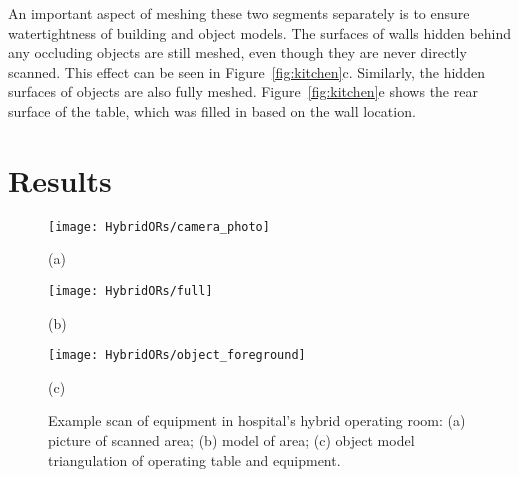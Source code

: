 \documentclass[review]{acmsiggraph}
\begin{document}
An important aspect of meshing these two segments separately is to ensure watertightness of building and object models.  The surfaces of walls hidden behind any occluding objects are still meshed, even though they are never directly scanned.  This effect can be seen in Figure~\ref{fig:kitchen}c.  Similarly, the hidden surfaces of objects are also fully meshed.  Figure~\ref{fig:kitchen}e shows the rear surface of the table, which was filled in based on the wall location.

\section{Results}
\label{sec:results}

\begin{figure}[t]

	\begin{minipage}[t]{0.9\linewidth}
		\centerline{\texttt{[image: HybridORs/camera\_photo]}}
		\centerline{(a)}
	\end{minipage}
	
	\begin{minipage}[t]{0.9\linewidth}
		\centerline{\texttt{[image: HybridORs/full]}}
		\centerline{(b)}
	\end{minipage}

	\begin{minipage}[t]{0.9\linewidth}
		\centerline{\texttt{[image: HybridORs/object\_foreground]}}
		\centerline{(c)}
	\end{minipage}

	\caption{Example scan of equipment in hospital's hybrid operating room: (a) picture of scanned area; (b) model of area; (c) object model triangulation of operating table and equipment.}
	\label{fig:hybrid}

\end{figure}
\end{document}
